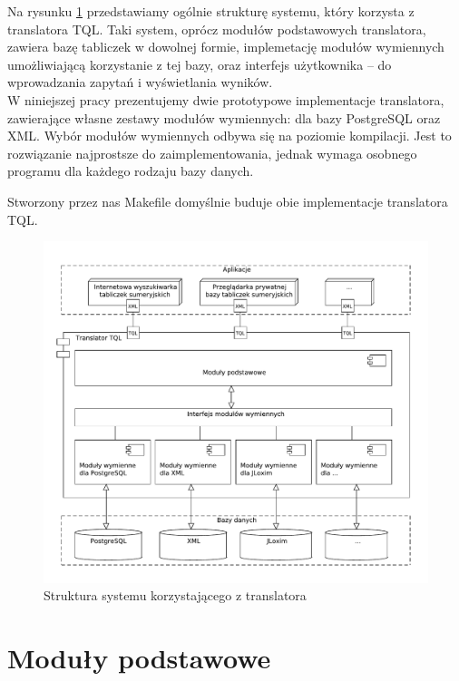 Na rysunku \ref{struktura_systemu} przedstawiamy ogólnie strukturę systemu, który korzysta z translatora TQL. Taki system, oprócz modułów podstawowych translatora, zawiera bazę tabliczek w dowolnej formie, implemetację modułów wymiennych umożliwiającą korzystanie z tej bazy, oraz interfejs użytkownika -- do wprowadzania zapytań i wyświetlania wyników. \\

 W niniejszej pracy prezentujemy dwie prototypowe implementacje translatora, zawierające własne zestawy modułów wymiennych: 
dla bazy PostgreSQL oraz XML.
Wybór modułów wymiennych odbywa się na poziomie kompilacji. Jest to rozwiązanie najprostsze do zaimplementowania,
jednak wymaga osobnego programu dla każdego rodzaju bazy danych.

 Stworzony przez nas Makefile domyślnie buduje obie implementacje translatora TQL.

\begin{figure}[h]
 \centering
 \includegraphics[width=450px,bb=0 0 608 517]{../diagramy/struktura2.pdf}
 \caption{Struktura systemu korzystającego z translatora}
 \label{struktura_systemu}
\end{figure}

\section{Moduły podstawowe}

